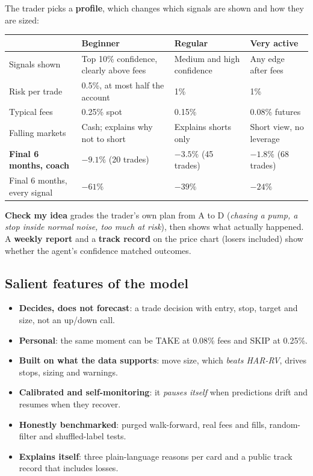 \documentclass[10pt,a4paper]{article}
\begin{document}
The trader picks a \textbf{profile}, which changes which signals are shown and how they are sized:

\begin{table}[H]
\centering\small
\begin{tabularx}{\textwidth}{lYYY}
\toprule
 & Beginner & Regular & Very active \\
\midrule
Signals shown & Top 10\% confidence, clearly above fees & Medium and high confidence & Any edge after fees \\
Risk per trade & 0.5\%, at most half the account & 1\% & 1\% \\
Typical fees & 0.25\% spot & 0.15\% & 0.08\% futures \\
Falling markets & Cash; explains why not to short & Explains shorts only & Short view, no leverage \\
\textbf{Final 6 months, coach} & $\mathbf{-9.1\%}$ (20 trades) & $\mathbf{-3.5\%}$ (45 trades) & $\mathbf{-1.8\%}$ (68 trades) \\
Final 6 months, every signal & $-61\%$ & $-39\%$ & $-24\%$ \\
\bottomrule
\end{tabularx}
\end{table}

\textbf{Check my idea} grades the trader's own plan from A to D (\emph{chasing a pump, a stop inside normal noise, too much at risk}),
then shows what actually happened. A \textbf{weekly report} and a \textbf{track record} on the price chart (losers included) show
whether the agent's confidence matched outcomes.

\subsection{Salient features of the model}
\begin{itemize}
  \item \textbf{Decides, does not forecast}: a trade decision with entry, stop, target and size, not an up/down call.
  \item \textbf{Personal}: the same moment can be TAKE at 0.08\% fees and SKIP at 0.25\%.
  \item \textbf{Built on what the data supports}: move size, which \emph{beats HAR-RV}, drives stops, sizing and warnings.
  \item \textbf{Calibrated and self-monitoring}: it \emph{pauses itself} when predictions drift and resumes when they recover.
  \item \textbf{Honestly benchmarked}: purged walk-forward, real fees and fills, random-filter and shuffled-label tests.
  \item \textbf{Explains itself}: three plain-language reasons per card and a public track record that includes losses.
\end{itemize}
\end{document}
